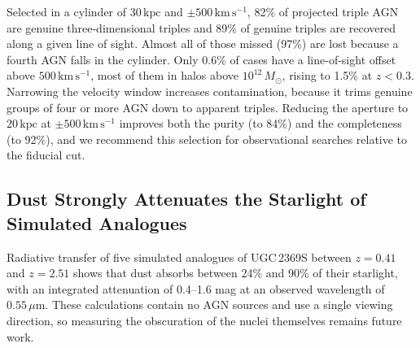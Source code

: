 \documentclass[twocolumn, 10pt]{article}
\begin{document}
Selected in a cylinder of $30\,\mathrm{kpc}$ and
$\pm 500\,\mathrm{km\,s^{-1}}$, 82\% of projected triple AGN are
genuine three-dimensional triples and 89\% of genuine triples are
recovered along a given line of sight. Almost all of those missed
(97\%) are lost because a fourth AGN falls in the cylinder. Only 0.6\%
of cases have a line-of-sight offset above
$500\,\mathrm{km\,s^{-1}}$, most of them in halos above
$10^{12}\,M_\odot$, rising to 1.5\% at $z < 0.3$. Narrowing the
velocity window increases contamination, because it trims genuine
groups of four or more AGN down to apparent triples. Reducing the
aperture to $20\,\mathrm{kpc}$ at $\pm 500\,\mathrm{km\,s^{-1}}$
improves both the purity (to 84\%) and the completeness (to 92\%), and
we recommend this selection for observational searches relative to
the fiducial cut.

\subsection*{Dust Strongly Attenuates the Starlight of Simulated
Analogues}

Radiative transfer of five simulated analogues of UGC\,2369S between
$z = 0.41$ and $z = 2.51$ shows that dust absorbs between 24\% and
90\% of their starlight, with an integrated attenuation of 0.4--1.6
mag at an observed wavelength of $0.55\,\mu\mathrm{m}$. These
calculations contain no AGN sources and use a single viewing
direction, so measuring the obscuration of the nuclei themselves
remains future work.




\newpage


\nocite{*}
\printbibliography
\end{document}
